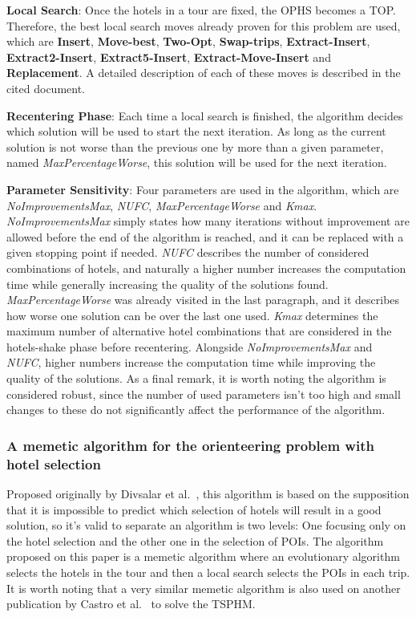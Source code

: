     \textbf{Local Search}: Once the hotels in a tour are fixed, the OPHS becomes a TOP. Therefore, the best local search moves already proven for this problem are used, which are \textbf{Insert}, \textbf{Move-best}, \textbf{Two-Opt}, \textbf{Swap-trips}, \textbf{Extract-Insert}, \textbf{Extract2-Insert}, \textbf{Extract5-Insert}, \textbf{Extract-Move-Insert} and \textbf{Replacement}. A detailed description of each of these moves is described in the cited document.

    \textbf{Recentering Phase}: Each time a local search is finished, the algorithm decides which solution will be used to start the next iteration. As long as the current solution is not worse than the previous one by more than a given parameter, named \textit{MaxPercentageWorse}, this solution will be used for the next iteration.

    \textbf{Parameter Sensitivity}: Four parameters are used in the algorithm, which are \textit{NoImprovementsMax}, \textit{NUFC}, \textit{MaxPercentageWorse} and \textit{Kmax}. \textit{NoImprovementsMax} simply states how many iterations without improvement are allowed before the end of the algorithm is reached, and it can be replaced with a given stopping point if needed. \textit{NUFC} describes the number of considered combinations of hotels, and naturally a higher number increases the computation time while generally increasing the quality of the solutions found. \textit{MaxPercentageWorse} was already visited in the last paragraph, and it describes how worse one solution can be over the last one used. \textit{Kmax} determines the maximum number of alternative hotel combinations that are considered in the hotels-shake phase before recentering. Alongside \textit{NoImprovementsMax} and \textit{NUFC}, higher numbers increase the computation time while improving the quality of the solutions. As a final remark, it is worth noting the algorithm is considered robust, since the number of used parameters isn't too high and small changes to these do not significantly affect the performance of the algorithm.
    
\subsubsection{A memetic algorithm for the orienteering problem with hotel selection}

    Proposed originally by Divsalar et al.~\cite{divsalar2014}, this algorithm is based on the supposition that it is impossible to predict which selection of hotels will result in a good solution, so it's valid to separate an algorithm is two levels: One focusing only on the hotel selection and the other one in the selection of POIs. The algorithm proposed on this paper is a memetic algorithm where an evolutionary algorithm selects the hotels in the tour and then a local search selects the POIs in each trip. It is worth noting that a very similar memetic algorithm is also used on another publication by Castro et al.~\cite{castro2013} to solve the TSPHM.

